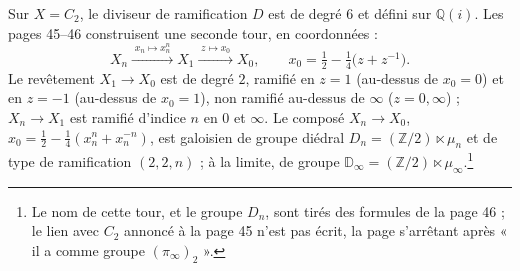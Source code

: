 \documentclass[11pt,a4paper]{article}
\begin{document}
Sur $X = C_{2}$, le diviseur de ramification $D$ est de degré $6$ et défini sur
$\mathbb{Q}(i)$. Les pages 45--46 construisent une seconde tour, en coordonnées :
\[
X_{n} \xrightarrow{\;x_{n} \mapsto x_{n}^{n}\;} X_{1} \xrightarrow{\;z \mapsto
x_{0}\;} X_{0}, \qquad
x_{0} = \tfrac12 - \tfrac14\bigl(z + z^{-1}\bigr).
\]
Le revêtement $X_{1} \to X_{0}$ est de degré $2$, ramifié en $z = 1$ (au-dessus
de $x_{0} = 0$) et en $z = -1$ (au-dessus de $x_{0} = 1$), non ramifié au-dessus
de $\infty$ ($z = 0, \infty$) ; $X_{n} \to X_{1}$ est ramifié d'indice $n$ en $0$ et
$\infty$. Le composé $X_{n} \to X_{0}$, $x_{0} = \tfrac12 - \tfrac14(x_{n}^{n} +
x_{n}^{-n})$, est galoisien de groupe diédral $D_{n} = (\mathbb{Z}/2) \ltimes \mu_{n}$
et de type de ramification $(2, 2, n)$ ; à la limite, de groupe
$\mathbb{D}_{\infty} = (\mathbb{Z}/2) \ltimes \mu_{\infty}$.\footnote{Le nom de
cette tour, et le groupe $D_{n}$, sont tirés des formules de la page 46 ; le
lien avec $C_{2}$ annoncé à la page 45 n'est pas écrit, la page s'arrêtant
après « il a comme groupe $(\pi_{\infty})_{2}$ ».}
\end{document}
